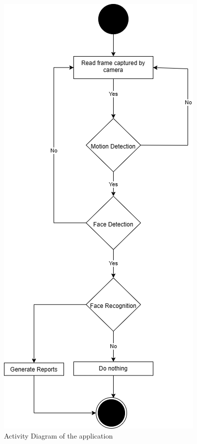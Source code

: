 \begin{figure}[H]
    \includegraphics[width=0.6\linewidth]{figures/activity-diagram.png}
    \centering
    \caption{Activity Diagram\cite{yasmeensmart} of the application}
    \label{fig:activity}
\end{figure}

